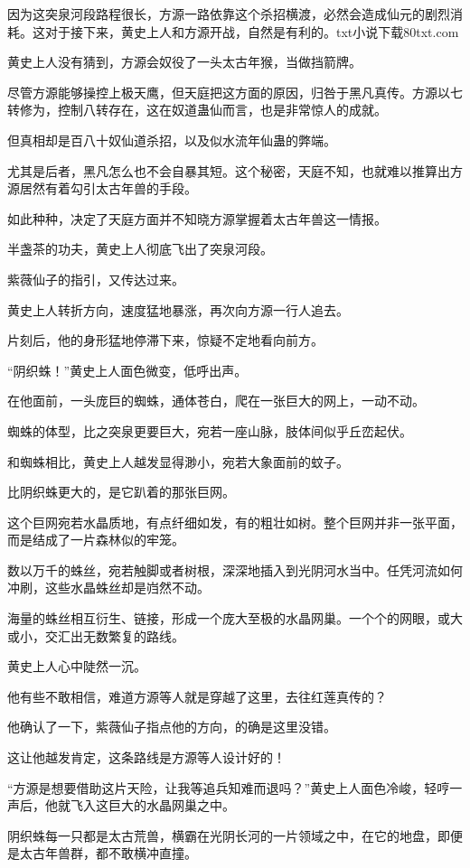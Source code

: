 \begin{this_body}
因为这突泉河段路程很长，方源一路依靠这个杀招横渡，必然会造成仙元的剧烈消耗。这对于接下来，黄史上人和方源开战，自然是有利的。txt小说下载80txt.com

黄史上人没有猜到，方源会奴役了一头太古年猴，当做挡箭牌。

尽管方源能够操控上极天鹰，但天庭把这方面的原因，归咎于黑凡真传。方源以七转修为，控制八转存在，这在奴道蛊仙而言，也是非常惊人的成就。

但真相却是百八十奴仙道杀招，以及似水流年仙蛊的弊端。

尤其是后者，黑凡怎么也不会自暴其短。这个秘密，天庭不知，也就难以推算出方源居然有着勾引太古年兽的手段。

如此种种，决定了天庭方面并不知晓方源掌握着太古年兽这一情报。

半盏茶的功夫，黄史上人彻底飞出了突泉河段。

紫薇仙子的指引，又传达过来。

黄史上人转折方向，速度猛地暴涨，再次向方源一行人追去。

片刻后，他的身形猛地停滞下来，惊疑不定地看向前方。

“阴织蛛！”黄史上人面色微变，低呼出声。

在他面前，一头庞巨的蜘蛛，通体苍白，爬在一张巨大的网上，一动不动。

蜘蛛的体型，比之突泉更要巨大，宛若一座山脉，肢体间似乎丘峦起伏。

和蜘蛛相比，黄史上人越发显得渺小，宛若大象面前的蚊子。

比阴织蛛更大的，是它趴着的那张巨网。

这个巨网宛若水晶质地，有点纤细如发，有的粗壮如树。整个巨网并非一张平面，而是结成了一片森林似的牢笼。

数以万千的蛛丝，宛若触脚或者树根，深深地插入到光阴河水当中。任凭河流如何冲刷，这些水晶蛛丝却是岿然不动。

海量的蛛丝相互衍生、链接，形成一个庞大至极的水晶网巢。一个个的网眼，或大或小，交汇出无数繁复的路线。

黄史上人心中陡然一沉。

他有些不敢相信，难道方源等人就是穿越了这里，去往红莲真传的？

他确认了一下，紫薇仙子指点他的方向，的确是这里没错。

这让他越发肯定，这条路线是方源等人设计好的！

“方源是想要借助这片天险，让我等追兵知难而退吗？”黄史上人面色冷峻，轻哼一声后，他就飞入这巨大的水晶网巢之中。

阴织蛛每一只都是太古荒兽，横霸在光阴长河的一片领域之中，在它的地盘，即便是太古年兽群，都不敢横冲直撞。


\end{this_body}
